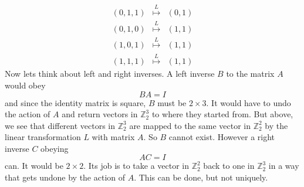 {\[\begin{array}{ccc}
(0,1,1)&\stackrel{L}\mapsto&(0,1)\\[2mm]
(0,1,0)&\stackrel{L}\mapsto&(1,1)\\
(1,0,1)&\stackrel{L}\mapsto&(1,1)\\
(1,1,1)&\stackrel{L}\mapsto&(1,1)
\end{array}
\]
Now lets think about left and right inverses. A left inverse $B$ to the matrix $A$
would obey
\[
BA=I
\]
and since the identity matrix is square, $B$ must be $2\times3$. It would have to undo the action of $A$ and return vectors in ${\mathbb Z}_2^3$
to where they started from. But above, we see that different vectors in ${\mathbb Z}_2^3$ are mapped to the same vector in ${\mathbb Z}_2^2$
by the linear transformation $L$ with matrix $A$. So $B$ cannot exist. However a right inverse $C$ obeying
\[
AC=I
\]
can. It would be $2\times2$. Its job is to take a vector in ${\mathbb Z}_2^2$ back to one in ${\mathbb Z}_2^3$ in a way that gets undone by the action of $A$.
This can be done, but not uniquely. 

} %

